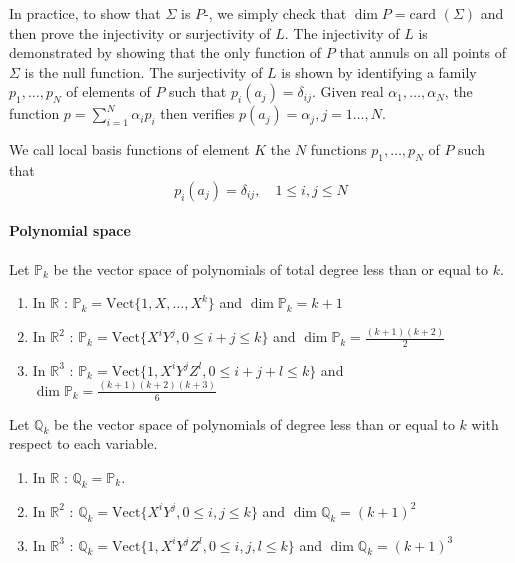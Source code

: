 \begin{Rem}
	In practice, to show that $\Sigma$ is $P$-, we simply check that $\dim P= \text{card } (\Sigma)$ and then prove the injectivity or surjectivity of $L$. The injectivity of $L$ is demonstrated by showing that the only function of $P$ that annuls on all points of $\Sigma$ is the null function. The surjectivity of $L$ is shown by identifying a family $p_1,\dots,p_N$ of elements of $P$ such that $p_i(a_j)=\delta_{ij}$. Given real $\alpha_1,\dots,\alpha_N$, the function $p=\sum_{i=1}^N\alpha_i p_i$ then verifies $p(a_j)=\alpha_j,j=1\dots,N$. 
\end{Rem}

\begin{Rem}
	We call local basis functions of element $K$ the $N$ functions $p_1,\dots,p_N$ of $P$ such that
	\begin{equation*}
		p_i(a_j)=\delta_{ij},\quad 1\le i,j\le N
	\end{equation*}
\end{Rem}

\paragraph{Polynomial space}

Let $\mathbb{P}_k$ be the vector space of polynomials of total degree less than or equal to $k$.

\begin{enumerate}[label=\textbullet]
	\item In $\mathbb{R}$ : $\mathbb{P}_k=\text{Vect}\{1,X,\dots,X^k\}$ and $\dim\mathbb{P}_k=k+1$ 
	\item In $\mathbb{R}^2$ : $\mathbb{P}_k=\text{Vect}\{X^iY^j,0\le i+j\le k\}$ and $\dim\mathbb{P}_k=\frac{(k+1)(k+2)}{2}$
	\item In $\mathbb{R}^3$ : $\mathbb{P}_k=\text{Vect}\{1,X^iY^jZ^l,0\le i+j+l\le k\}$ and $\dim\mathbb{P}_k=\frac{(k+1)(k+2)(k+3)}{6}$
\end{enumerate}

Let $\mathbb{Q}_k$ be the vector space of polynomials of degree less than or equal to $k$ with respect to each variable.

\begin{enumerate}[label=\textbullet]
	\item In $\mathbb{R}$ : $\mathbb{Q}_k=\mathbb{P}_k$. 
	\item In $\mathbb{R}^2$ : $\mathbb{Q}_k=\text{Vect}\{X^iY^j,0\le i,j\le k\}$ and $\dim\mathbb{Q}_k=(k+1)^2$
	\item In $\mathbb{R}^3$ : $\mathbb{Q}_k=\text{Vect}\{1,X^iY^jZ^l,0\le i,j,l\le k\}$ and $\dim\mathbb{Q}_k=(k+1)^3$
\end{enumerate}

